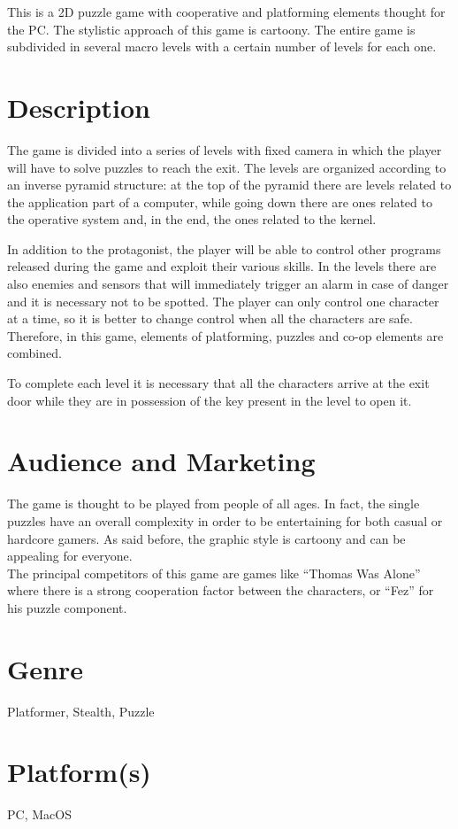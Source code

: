 \documentclass[12pt, a4paper]{report}
\begin{document}
This is a 2D puzzle game with cooperative and platforming elements thought for the PC. The stylistic approach of this game is cartoony. The entire game is subdivided in several macro levels with a certain number of levels for each one.

\section*{Description}
The game is divided into a series of levels with fixed camera in which the player will have to solve puzzles to reach the exit. The levels are organized according to an inverse pyramid structure: at the top of the pyramid there are levels related to the application part of a computer, while going down there are ones related to the operative system and, in the end, the ones related to the kernel.

In addition to the protagonist, the player will be able to control other programs released during the game and exploit their various skills. In the levels there are also enemies and sensors that will immediately trigger an alarm in case of danger and it is necessary not to be spotted. The player can only control one character at a time, so it is better to change control when all the characters are safe. Therefore, in this game, elements of platforming, puzzles and co-op elements are combined.

To complete each level it is necessary that all the characters arrive at the exit door while they are in possession of the key present in the level to open it.

\section*{Audience and Marketing}
The game is thought to be played from people of all ages. In fact, the single puzzles have an overall complexity in order to be entertaining for both casual or hardcore gamers. As said before, the graphic style is cartoony and can be appealing for everyone.\\
The principal competitors of this game are games like “Thomas Was Alone” where there is a strong cooperation factor between the characters, or “Fez” for his puzzle component.

\section*{Genre}
Platformer, Stealth, Puzzle
\section*{Platform(s)}
PC, MacOS
\end{document}
